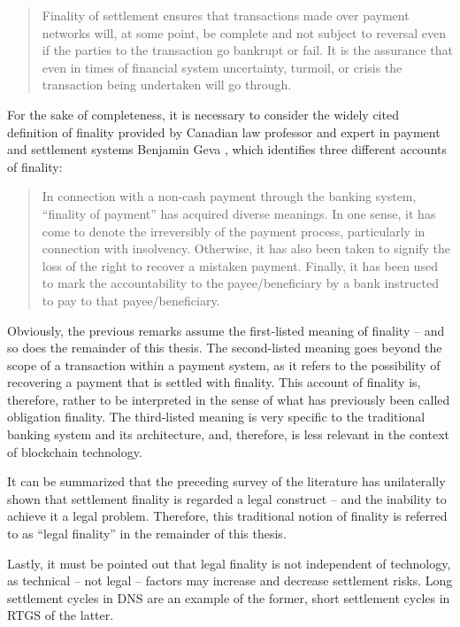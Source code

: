 \begin{quote}
	Finality of settlement ensures that transactions made over payment networks will, at some point, be complete and not subject to reversal even if the parties to the transaction go bankrupt or fail.
	It is the assurance that even in times of financial system uncertainty, turmoil, or crisis the transaction being undertaken will go through.
\end{quote}

For the sake of completeness, it is necessary to consider the widely cited definition of finality provided by Canadian law professor and expert in payment and settlement systems Benjamin Geva \autocite[633, 634]{geva2008}, which identifies three different accounts of finality:

\begin{quote}
	In connection with a non-cash payment through the banking system, ``finality of payment'' has acquired diverse meanings.
	In one sense, it has come to denote the irreversibly of the payment process, particularly in connection with insolvency.
	Otherwise, it has also been taken to signify the loss of the right to recover a mistaken payment.
	Finally, it has been used to mark the accountability to the payee/beneficiary by a bank instructed to pay to that payee/beneficiary. 
\end{quote}

Obviously, the previous remarks assume the first-listed meaning of finality -- and so does the remainder of this thesis.
The second-listed meaning goes beyond the scope of a transaction within a payment system, as it refers to the possibility of recovering a payment that is settled with finality.
This account of finality is, therefore, rather to be interpreted in the sense of what has previously been called obligation finality.
The third-listed meaning is very specific to the traditional banking system and its architecture, and, therefore, is less relevant in the context of blockchain technology.

It can be summarized that the preceding survey of the literature has unilaterally shown that settlement finality is regarded a legal construct -- and the inability to achieve it a legal problem.
Therefore, this traditional notion of finality is referred to as ``legal finality'' in the remainder of this thesis.

Lastly, it must be pointed out that legal finality is not independent of technology, as technical -- not legal -- factors may increase and decrease settlement risks.
Long settlement cycles in DNS are an example of the former, short settlement cycles in RTGS of the latter.
